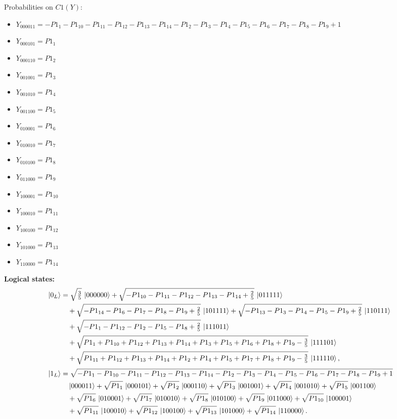 \documentclass[11pt]{article}
\begin{document}
Probabilities on $C1 (Y)$:
\begin{itemize}
    \item $Y_{000011} = -P1_1 - P1_{10} - P1_{11} - P1_{12} - P1_{13} - P1_{14} - P1_2 - P1_3 - P1_4 - P1_5 - P1_6 - P1_7 - P1_8 - P1_9 + 1$
    \item $Y_{000101} = P1_1$
    \item $Y_{000110} = P1_2$
    \item $Y_{001001} = P1_3$
    \item $Y_{001010} = P1_4$
    \item $Y_{001100} = P1_5$
    \item $Y_{010001} = P1_6$
    \item $Y_{010010} = P1_7$
    \item $Y_{010100} = P1_8$
    \item $Y_{011000} = P1_9$
    \item $Y_{100001} = P1_{10}$
    \item $Y_{100010} = P1_{11}$
    \item $Y_{100100} = P1_{12}$
    \item $Y_{101000} = P1_{13}$
    \item $Y_{110000} = P1_{14}$
\end{itemize}

\noindent\textbf{Logical states:}
\begin{align*}
\ket{0_L} &= \sqrt{\tfrac{3}{5}}\,\ket{000000} + \sqrt{-P1_{10} - P1_{11} - P1_{12} - P1_{13} - P1_{14} + \tfrac{2}{5}}\,\ket{011111}\\
&\quad + \sqrt{-P1_{14} - P1_6 - P1_7 - P1_8 - P1_9 + \tfrac{2}{5}}\,\ket{101111} + \sqrt{-P1_{13} - P1_3 - P1_4 - P1_5 - P1_9 + \tfrac{2}{5}}\,\ket{110111}\\
&\quad + \sqrt{-P1_1 - P1_{12} - P1_2 - P1_5 - P1_8 + \tfrac{2}{5}}\,\ket{111011}\\
&\quad+ \sqrt{P1_1 + P1_{10} + P1_{12} + P1_{13} + P1_{14} + P1_3 + P1_5 + P1_6 + P1_8 + P1_9 - \tfrac{3}{5}}\,\ket{111101}\\
&\quad + \sqrt{P1_{11} + P1_{12} + P1_{13} + P1_{14} + P1_2 + P1_4 + P1_5 + P1_7 + P1_8 + P1_9 - \tfrac{3}{5}}\,\ket{111110},
\\[2pt]
\ket{1_L} &= \sqrt{-P1_1 - P1_{10} - P1_{11} - P1_{12} - P1_{13} - P1_{14} - P1_2 - P1_3 - P1_4 - P1_5 - P1_6 - P1_7 - P1_8 - P1_9 + 1}\,\\
&\quad \ket{000011} + \sqrt{P1_1}\,\ket{000101} + \sqrt{P1_2}\,\ket{000110} + \sqrt{P1_3}\,\ket{001001} + \sqrt{P1_4}\,\ket{001010} + \sqrt{P1_5}\,\ket{001100}\\
&\quad + \sqrt{P1_6}\,\ket{010001} + \sqrt{P1_7}\,\ket{010010} + \sqrt{P1_8}\,\ket{010100} + \sqrt{P1_9}\,\ket{011000} + \sqrt{P1_{10}}\,\ket{100001}\\
&\quad + \sqrt{P1_{11}}\,\ket{100010} + \sqrt{P1_{12}}\,\ket{100100} + \sqrt{P1_{13}}\,\ket{101000} + \sqrt{P1_{14}}\,\ket{110000}.
\end{align*}
\end{document}
